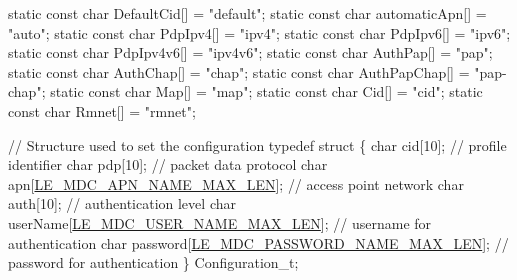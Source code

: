 \begin{DoxyCodeInclude}
\textcolor{keyword}{static} \textcolor{keyword}{const} \textcolor{keywordtype}{char} DefaultCid[] = \textcolor{stringliteral}{"default"};
\textcolor{keyword}{static} \textcolor{keyword}{const} \textcolor{keywordtype}{char} automaticApn[] = \textcolor{stringliteral}{"auto"};
\textcolor{keyword}{static} \textcolor{keyword}{const} \textcolor{keywordtype}{char} PdpIpv4[] = \textcolor{stringliteral}{"ipv4"};
\textcolor{keyword}{static} \textcolor{keyword}{const} \textcolor{keywordtype}{char} PdpIpv6[] = \textcolor{stringliteral}{"ipv6"};
\textcolor{keyword}{static} \textcolor{keyword}{const} \textcolor{keywordtype}{char} PdpIpv4v6[] = \textcolor{stringliteral}{"ipv4v6"};
\textcolor{keyword}{static} \textcolor{keyword}{const} \textcolor{keywordtype}{char} AuthPap[] = \textcolor{stringliteral}{"pap"};
\textcolor{keyword}{static} \textcolor{keyword}{const} \textcolor{keywordtype}{char} AuthChap[] = \textcolor{stringliteral}{"chap"};
\textcolor{keyword}{static} \textcolor{keyword}{const} \textcolor{keywordtype}{char} AuthPapChap[] = \textcolor{stringliteral}{"pap-chap"};
\textcolor{keyword}{static} \textcolor{keyword}{const} \textcolor{keywordtype}{char} Map[] = \textcolor{stringliteral}{"map"};
\textcolor{keyword}{static} \textcolor{keyword}{const} \textcolor{keywordtype}{char} Cid[] = \textcolor{stringliteral}{"cid"};
\textcolor{keyword}{static} \textcolor{keyword}{const} \textcolor{keywordtype}{char} Rmnet[] = \textcolor{stringliteral}{"rmnet"};

\textcolor{comment}{// Structure used to set the configuration}
\textcolor{keyword}{typedef} \textcolor{keyword}{struct}
\{
    \textcolor{keywordtype}{char}   cid[10];                                 \textcolor{comment}{// profile identifier}
    \textcolor{keywordtype}{char}   pdp[10];                                 \textcolor{comment}{// packet data protocol}
    \textcolor{keywordtype}{char}   apn[\hyperlink{le__mdc__interface_8h_a94003147532b5c18b83cac9a4e1eb054}{LE\_MDC\_APN\_NAME\_MAX\_LEN}];            \textcolor{comment}{// access point network}
    \textcolor{keywordtype}{char}   auth[10];                                \textcolor{comment}{// authentication level}
    \textcolor{keywordtype}{char}   userName[\hyperlink{le__mdc__interface_8h_ad246bc94c8c69c08d2765cc0570aa3cf}{LE\_MDC\_USER\_NAME\_MAX\_LEN}];      \textcolor{comment}{// username for authentication}
    \textcolor{keywordtype}{char}   password[\hyperlink{le__mdc__interface_8h_a37643c42ade5141861f6c19c17378c2f}{LE\_MDC\_PASSWORD\_NAME\_MAX\_LEN}];  \textcolor{comment}{// password for
       authentication}
\}
Configuration\_t;


\end{DoxyCodeInclude}
